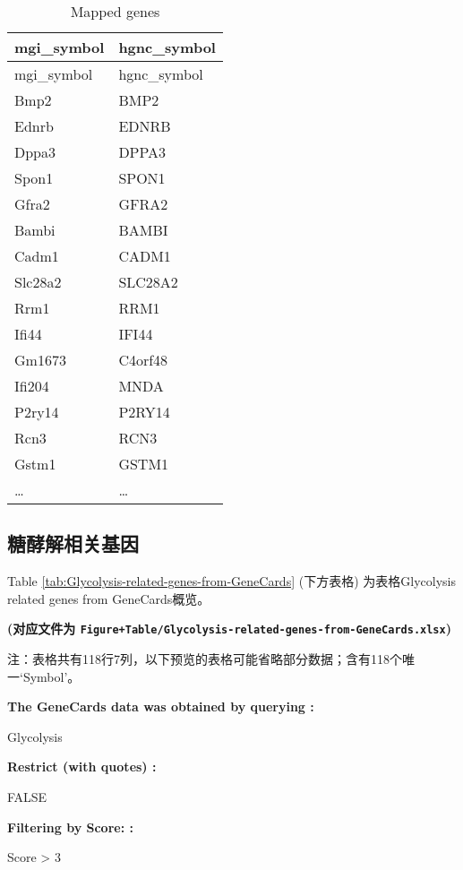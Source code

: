 \documentclass[
]{article}
\begin{document}
\begin{longtable}[]{@{}ll@{}}
\caption{\label{tab:Mapped-genes}Mapped genes}\tabularnewline
\toprule
mgi\_symbol & hgnc\_symbol\tabularnewline
\midrule
\endfirsthead
\toprule
mgi\_symbol & hgnc\_symbol\tabularnewline
\midrule
\endhead
Bmp2 & BMP2\tabularnewline
Ednrb & EDNRB\tabularnewline
Dppa3 & DPPA3\tabularnewline
Spon1 & SPON1\tabularnewline
Gfra2 & GFRA2\tabularnewline
Bambi & BAMBI\tabularnewline
Cadm1 & CADM1\tabularnewline
Slc28a2 & SLC28A2\tabularnewline
Rrm1 & RRM1\tabularnewline
Ifi44 & IFI44\tabularnewline
Gm1673 & C4orf48\tabularnewline
Ifi204 & MNDA\tabularnewline
P2ry14 & P2RY14\tabularnewline
Rcn3 & RCN3\tabularnewline
Gstm1 & GSTM1\tabularnewline
\ldots{} & \ldots{}\tabularnewline
\bottomrule
\end{longtable}

\hypertarget{ux7cd6ux9175ux89e3ux76f8ux5173ux57faux56e0}{%
\subsection{糖酵解相关基因}\label{ux7cd6ux9175ux89e3ux76f8ux5173ux57faux56e0}}

Table \ref{tab:Glycolysis-related-genes-from-GeneCards} (下方表格) 为表格Glycolysis related genes from GeneCards概览。

\textbf{(对应文件为 \texttt{Figure+Table/Glycolysis-related-genes-from-GeneCards.xlsx})}

\begin{center}\begin{tcolorbox}[colback=gray!10, colframe=gray!50, width=0.9\linewidth, arc=1mm, boxrule=0.5pt]注：表格共有118行7列，以下预览的表格可能省略部分数据；含有118个唯一`Symbol'。
\end{tcolorbox}
\end{center}\begin{center}\begin{tcolorbox}[colback=gray!10, colframe=gray!50, width=0.9\linewidth, arc=1mm, boxrule=0.5pt]
\textbf{
The GeneCards data was obtained by querying
:}

\vspace{0.5em}

    Glycolysis

\vspace{2em}


\textbf{
Restrict (with quotes)
:}

\vspace{0.5em}

    FALSE

\vspace{2em}


\textbf{
Filtering by Score:
:}

\vspace{0.5em}

    Score > 3

\vspace{2em}
\end{tcolorbox}
\end{center}
\end{document}

